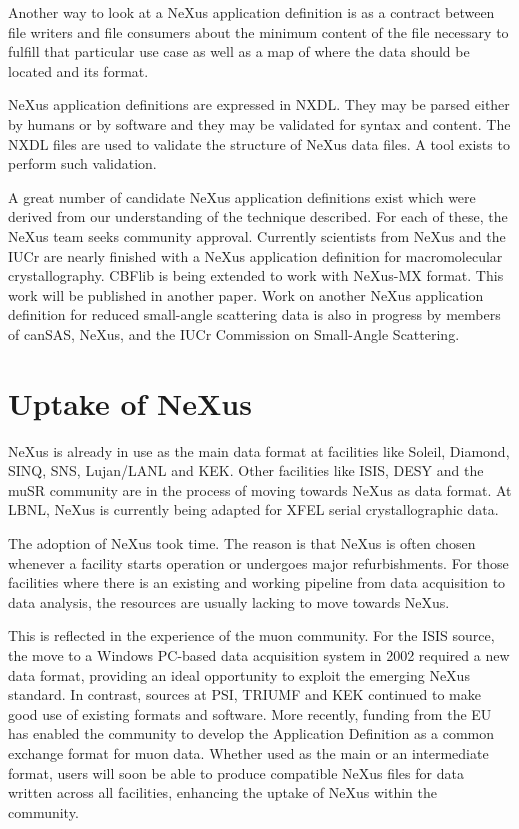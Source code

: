 \documentclass[%
 aip,
rsi,
 amsmath,amssymb,
 reprint,%
]{revtex4-1}
\begin{document}
Another way to look at a NeXus application definition is as a contract between file writers and file consumers 
about the minimum content of the file necessary to fulfill that particular use case as well as a map of where the 
data should be located and its format.

NeXus application definitions are expressed in NXDL.  They may be parsed either by humans or by software and 
they may be validated for syntax and content.  The NXDL files are used to validate the structure of
NeXus data files. A tool exists to perform such validation.%

A great number of candidate NeXus application definitions exist which were derived from our understanding 
of the technique described. For each of these, the NeXus team seeks community approval. 
Currently scientists 
from NeXus and the IUCr are nearly finished with a NeXus application definition for macromolecular crystallography.
CBFlib\cite{cbflib} is being extended to work with NeXus-MX format. This work will be published in another paper. 
Work on another NeXus application definition for reduced small-angle scattering data
is also in progress\cite{cansas}  by members of 
canSAS, NeXus, and the IUCr Commission on Small-Angle Scattering.


\section{Uptake of NeXus} 

NeXus is already in use as the main data format at facilities like Soleil, Diamond, SINQ, SNS, Lujan/LANL 
and KEK. Other facilities like ISIS, DESY and the muSR community are in the process of moving towards 
NeXus as  data format. At LBNL, NeXus is currently being adapted for XFEL serial crystallographic data. 


The adoption of NeXus took time. The reason is that NeXus is often chosen whenever 
a facility starts operation or undergoes major refurbishments. For those facilities where there is an existing and working 
pipeline from data acquisition to data analysis,  the resources are usually lacking to move 
towards NeXus.

This is reflected in the experience of the muon community. For the ISIS source, the move to a Windows PC-based data acquisition 
system in 2002 required a new data format, providing an ideal opportunity to exploit the emerging NeXus standard\cite{muon1}. In 
contrast, sources at PSI, TRIUMF and KEK continued to make good use of existing formats and software. More recently, funding 
from the EU has enabled the community to develop the Application Definition as a common exchange format for muon data\cite{muon2}. 
Whether used as the main or an intermediate format, users will soon be able to produce compatible NeXus files for data written 
across all facilities, enhancing the uptake of NeXus within the community.
\end{document}
